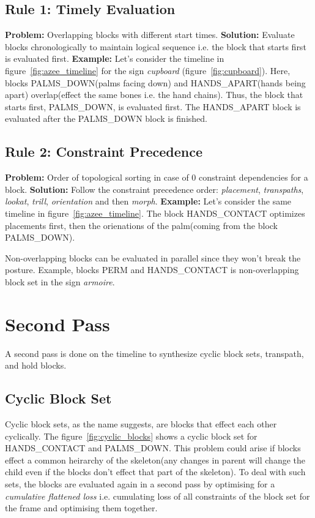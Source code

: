\documentclass[../../main.tex]{subfiles}
\begin{document}
\subsection{Rule 1: Timely Evaluation}
\label{ch:multi_track:resolve_conflitcs:rule1}
\textbf{Problem:} Overlapping blocks with different start times.
\textbf{Solution:} Evaluate blocks chronologically to maintain logical sequence i.e. the block that starts first is evaluated first.
\textbf{Example:} Let's consider the timeline in figure~\ref{fig:azee_timeline} for the sign \emph{cupboard} (figure~\ref{fig:cupboard}). Here, blocks PALMS\_DOWN(palms facing down) and HANDS\_APART(hands being apart) overlap(effect the same bones i.e. the hand chains). Thus, the block that starts first, PALMS\_DOWN, is evaluated first. The HANDS\_APART block is evaluated after the PALMS\_DOWN block is finished.

\subsection{Rule 2: Constraint Precedence}
\label{ch:multi_track:resolve_conflitcs:rule2}
\textbf{Problem:} Order of topological sorting in case of 0 constraint dependencies for a block.
\textbf{Solution:} Follow the constraint precedence order: \emph{placement}, \emph{transpaths}, \emph{lookat}, \emph{trill}, \emph{orientation} and then \emph{morph}.
\textbf{Example:} Let's consider the same timeline in figure~\ref{fig:azee_timeline}. The block HANDS\_CONTACT optimizes placements first, then the orienations of the palm(coming from the block PALMS\_DOWN).

Non-overlapping blocks can be evaluated in parallel since they won't break the posture. Example, blocks PERM and HANDS\_CONTACT is non-overlapping block set in the sign \emph{armoire}.

\section{Second Pass}
\label{ch:multi_track:second_pass}

A second pass is done on the timeline to synthesize cyclic block sets, transpath, and hold blocks.

\subsection{Cyclic Block Set}
\label{ch:multi_track:second_pass:cyclic_blocks}

Cyclic block sets, as the name suggests, are blocks that effect each other cyclically. The figure~\ref{fig:cyclic_blocks} shows a cyclic block set for HANDS\_CONTACT and PALMS\_DOWN. This problem could arise if blocks effect a common heirarchy of the skeleton(any changes in parent will change the child even if the blocks don't effect that part of the skeleton). To deal with such sets, the blocks are evaluated again in a second pass by optimising for a \emph{cumulative flattened loss} i.e. cumulating loss of all constraints of the block set for the frame and optimising them together.
\end{document}
